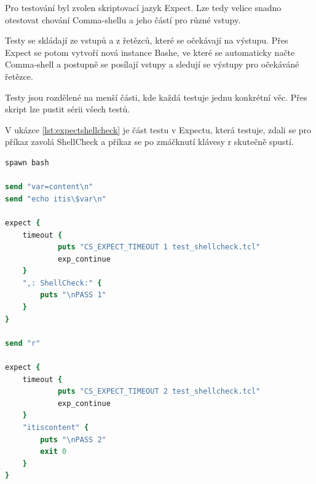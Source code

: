 \documentclass[thesis=M,czech]{FITthesis}[2012/06/26]
\begin{document}
Pro testování byl zvolen skriptovací jazyk Expect. Lze tedy velice snadno otestovat chování Comma-shellu a jeho částí pro různé vstupy.

Testy se skládají ze vstupů a z řetězců, které se očekávají na výstupu. Přes Expect se potom vytvoří nová instance Bashe, ve které se automaticky načte Comma-shell a postupně se posílají vstupy a sledují se výstupy pro očekáváné řetězce.

Testy jsou rozdělené na menší části, kde každá testuje jednu konkrétní věc. Přes skript lze pustit sérii všech testů.

V ukázce \ref{lst:expectshellcheck} je část testu v Expectu, která testuje, zdali se pro příkaz zavolá ShellCheck a příkaz se po zmáčknutí klávesy r skutečně spustí. 


\begin{minipage}{\linewidth}
\begin{lstlisting}[language=tcl, caption={Expect test}, label={lst:expectshellcheck}]
spawn bash

send "var=content\n"
send "echo itis\$var\n"

expect {
	timeout {
			puts "CS_EXPECT_TIMEOUT 1 test_shellcheck.tcl"
			exp_continue
	}
	",: ShellCheck:" {
		puts "\nPASS 1"
	}
}

send "r"

expect {
	timeout {
			puts "CS_EXPECT_TIMEOUT 2 test_shellcheck.tcl"
			exp_continue
	}
	"itiscontent" {
		puts "\nPASS 2"
		exit 0
	}
}
\end{lstlisting}
\end{minipage}





\end{document}
